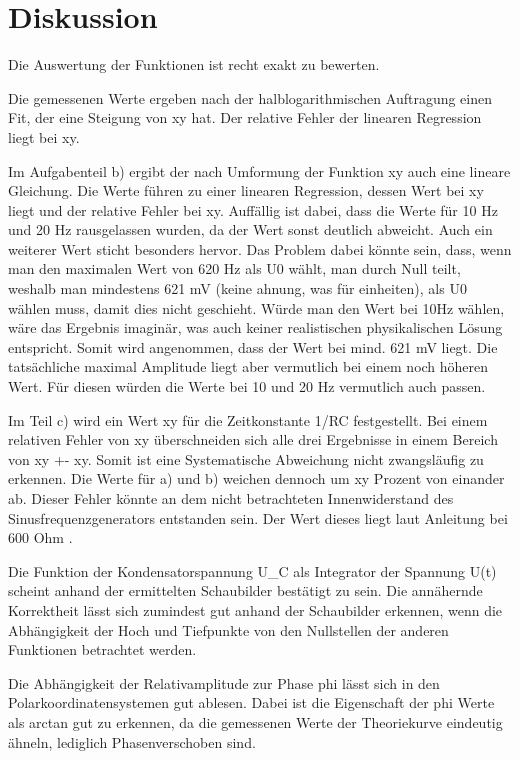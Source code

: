 \section{Diskussion}
\label{sec:Diskussion}

Die Auswertung der Funktionen ist recht exakt zu bewerten. 

Die gemessenen Werte ergeben nach der halblogarithmischen Auftragung einen Fit, der eine Steigung von xy hat. Der relative Fehler der linearen Regression liegt bei xy. 

Im Aufgabenteil b) ergibt der nach Umformung der Funktion xy auch eine lineare Gleichung. Die Werte führen zu einer linearen Regression, dessen Wert bei xy liegt und der relative Fehler bei xy. Auffällig ist dabei, dass die Werte für 10 Hz und 20 Hz rausgelassen wurden, da der Wert sonst deutlich abweicht. Auch ein weiterer Wert sticht besonders hervor. Das Problem dabei könnte sein, dass, wenn man den maximalen Wert von 620 Hz als U0 wählt, man durch Null teilt, weshalb man mindestens 621 mV (keine ahnung, was für einheiten), als U0 wählen muss, damit dies nicht geschieht. Würde man den Wert bei 10Hz wählen, wäre das Ergebnis imaginär, was auch keiner realistischen physikalischen Lösung entspricht. Somit wird angenommen, dass der Wert bei mind. 621 mV liegt. Die tatsächliche maximal Amplitude liegt aber vermutlich bei einem noch höheren Wert. Für diesen würden die Werte bei 10 und 20 Hz vermutlich auch passen. 

Im Teil c) wird ein Wert xy für die Zeitkonstante 1/RC festgestellt. Bei einem relativen Fehler von xy überschneiden sich alle drei Ergebnisse in einem Bereich von xy +- xy. Somit ist eine Systematische Abweichung nicht zwangsläufig zu erkennen. Die Werte für a) und b) weichen dennoch um xy Prozent von einander ab. Dieser Fehler könnte an dem nicht betrachteten Innenwiderstand des Sinusfrequenzgenerators entstanden sein. Der Wert dieses liegt laut Anleitung bei 600 Ohm \cite{V353}. 

Die Funktion der Kondensatorspannung U_C als Integrator der Spannung U(t) scheint anhand der ermittelten Schaubilder bestätigt zu sein. Die annähernde Korrektheit lässt sich zumindest gut anhand der Schaubilder erkennen, wenn die Abhängigkeit der Hoch und Tiefpunkte von den Nullstellen der anderen Funktionen betrachtet werden. 

Die Abhängigkeit der Relativamplitude zur Phase phi lässt sich in den Polarkoordinatensystemen gut ablesen. Dabei ist die Eigenschaft der phi Werte als arctan gut zu erkennen, da die gemessenen Werte der Theoriekurve eindeutig ähneln, lediglich Phasenverschoben sind. 

